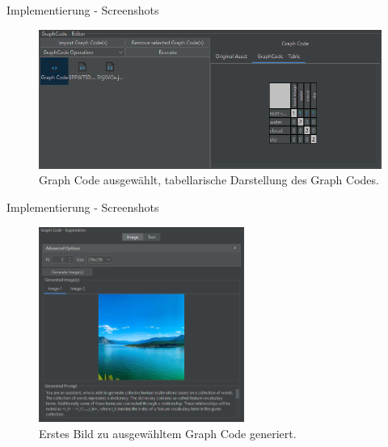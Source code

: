 \documentclass[t]{beamer}
\begin{document}
\begin{frame}{Implementierung - Screenshots}

  \begin{figure}
    \includegraphics[width=\textwidth]{images/left_sel}
    \caption{Graph Code ausgewählt, tabellarische Darstellung des Graph Codes.}
  \end{figure}

\end{frame}

\begin{frame}{Implementierung - Screenshots}

  \begin{figure}
    \includegraphics[width=0.6\textwidth]{images/right_img_two_exps_1}
    \caption{Erstes Bild zu ausgewähltem Graph Code generiert.}
  \end{figure}

\end{frame}
\end{document}
